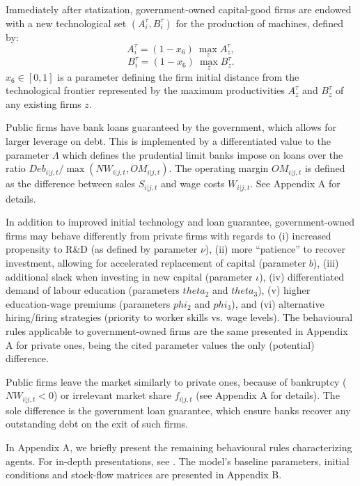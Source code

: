 \documentclass[a4paper,11pt]{article}
\begin{document}
Immediately after statization, government-owned capital-good firms are endowed with a new technological set $(A_i^\tau, B_i^\tau)$ for the production of machines, defined by:
\begin{equation}
	A_i^\tau = \left( 1 - x_6 \right) \ \max_z { A_z^\tau },
\end{equation}
\begin{equation}
	B_i^\tau = \left( 1 - x_6 \right) \ \max_z { B_z^\tau }.
\end{equation}
$x_6 \in [0, 1]$ is a parameter defining the firm initial distance from the technological frontier represented by the maximum productivities $A_z^\tau$ and $B_z^\tau$ of any existing firms $z$.

Public firms have bank loans guaranteed by the government, which allows for larger leverage on debt. This is implemented by a differentiated value to the parameter $\Lambda$ which defines the prudential limit banks impose on loans over the ratio $Deb_{i|j,t} / \max{ \left( NW_{i|j,t}, OM_{i|j,t} \right) }$. The operating margin $OM_{i|j,t}$ is defined as the difference between sales $S_{i|j,t}$ and wage costs $W_{i|j,t}$. See Appendix A for details.

In addition to improved initial technology and loan guarantee, government-owned firms may behave differently from private firms with regards to (i) increased propensity to R\&D (as defined by parameter $\nu$), (ii) more ``patience'' to recover investment, allowing for accelerated replacement of capital (parameter $b$), (iii) additional slack when investing in new capital (parameter $\iota$), (iv) differentiated demand of labour education (parameters $theta_2$ and $theta_3$), (v) higher education-wage premiums (parameters $phi_2$ and $phi_3$), and (vi) alternative hiring/firing strategies (priority to worker skills vs. wage levels). The behavioural rules applicable to government-owned firms are the same presented in Appendix A for private ones, being the cited parameter values the only (potential) difference.

Public firms leave the market similarly to private ones, because of bankruptcy ($NW_{i|j,t} < 0$) or irrelevant market share $f_{i|j,t}$ (see Appendix A for details). The sole difference is the government loan guarantee, which ensure banks recover any outstanding debt on the exit of such firms.


\bigskip

In Appendix A, we briefly present the remaining behavioural rules characterizing agents. For in-depth presentations, see \citealp{dosi2010schumpeter, dosi2015fiscal, dosi2017flexibility, fanti2022education, fanti2024ns}. The model's baseline parameters, initial conditions and stock-flow matrices are presented in Appendix B.
\end{document}
